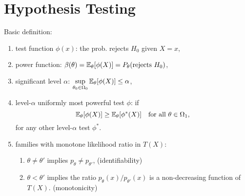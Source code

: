 \section*{Hypothesis Testing}

Basic definition: \begin{enumerate}[
        leftmargin = 2em,
    ]
    \item test function $\phi(x)$: the prob. rejects $H_0$ given $X=x$,
    \item power function: $\beta(\theta) = \mathbb{E}_\theta[\phi(X)] = P_\theta(\text{rejects}\ H_0)$,
    \item significant level $\alpha$: $\sup\limits_{\theta_0\in\Omega_0} \mathbb{E}_\theta[\phi(X)] \leq \alpha$,
    \item \vspace{-1ex} level-$\alpha$ uniformly most powerful test $\phi$: if $$
        \mathbb{E}_\theta[\phi(X)] \geq \mathbb{E}_\theta[\phi^*(X)] \quad \text{for all } \theta \in \Omega_1,
    $$ for any other level-$\alpha$ test $\phi^*$.
    \item families with monotone likelihood ratio in $T(X)$: \begin{enumerate}
        \item $\theta \neq \theta'$ implies $p_\theta \neq p_{\theta'}$, (identifiability)
        \item $\theta < \theta'$ implies the ratio $p_\theta(x) / p_{\theta'}(x)$ is a non-decreasing function of $T(X)$. (monotonicity)
    \end{enumerate}
\end{enumerate}


